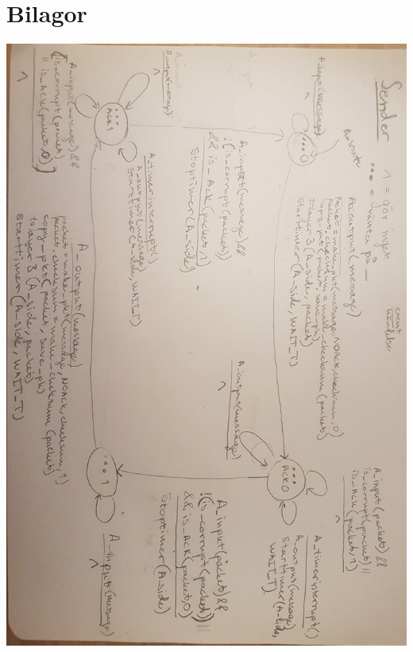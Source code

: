\section{Bilagor}
\begin{center}
    \includegraphics[scale=0.5]{bilder/sender.jpg}
    \label{fig:1}
\end{center}

